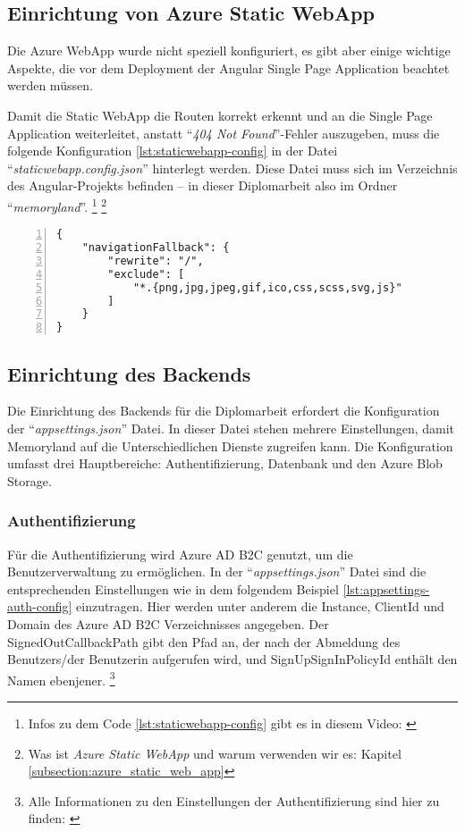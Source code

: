 \subsection{Einrichtung von Azure Static WebApp}

Die Azure WebApp wurde nicht speziell konfiguriert, es gibt aber einige wichtige Aspekte, 
die vor dem Deployment der Angular Single Page Application beachtet werden müssen.  

Damit die Static WebApp die Routen korrekt erkennt und an die Single Page Application 
weiterleitet, anstatt ``\emph{404 Not Found}''-Fehler auszugeben, muss die folgende 
Konfiguration \ref{lst:staticwebapp-config} in der Datei ``\emph{staticwebapp.config.json}'' hinterlegt werden. 
Diese Datei muss sich im Verzeichnis des Angular-Projekts befinden -- in dieser Diplomarbeit
also im Ordner ``\emph{memoryland}''. \footnote{Infos zu dem Code \ref{lst:staticwebapp-config} gibt es in diesem Video: \cite{MicrosoftCorporationj}}
\footnote{Was ist \emph{Azure Static WebApp} und warum verwenden wir es: Kapitel \ref{subsection:azure_static_web_app}}

\begin{lstlisting}[numbers=left,caption={staticwebapp.config.json},label={lst:staticwebapp-config}]
{
    "navigationFallback": {
        "rewrite": "/",
        "exclude": [
            "*.{png,jpg,jpeg,gif,ico,css,scss,svg,js}"
        ]
    }
}
\end{lstlisting}


\subsection{Einrichtung des Backends}

Die Einrichtung des Backends für die Diplomarbeit erfordert die Konfiguration 
der ``\emph{appsettings.json}'' Datei. In dieser Datei stehen mehrere Einstellungen,
damit Memoryland auf die Unterschiedlichen Dienste zugreifen kann. Die Konfiguration 
umfasst drei Hauptbereiche: Authentifizierung, Datenbank und den Azure Blob Storage.

\subsubsection{Authentifizierung}

Für die Authentifizierung wird Azure AD B2C genutzt, um die Benutzerverwaltung zu ermöglichen. 
In der ``\emph{appsettings.json}'' Datei sind die entsprechenden Einstellungen wie in dem folgendem
Beispiel \ref{lst:appsettings-auth-config} einzutragen. Hier werden unter anderem die Instance, ClientId und Domain des 
Azure AD B2C Verzeichnisses angegeben. Der SignedOutCallbackPath gibt den Pfad an, der nach 
der Abmeldung des Benutzers/der Benutzerin aufgerufen wird, und SignUpSignInPolicyId enthält 
den Namen ebenjener. \footnote{Alle Informationen zu den Einstellungen der Authentifizierung sind hier zu finden: \cite{MicrosoftCorporationk}}


